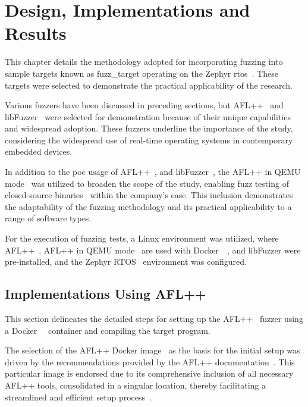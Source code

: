 \vspace{21.5pt}
\chapter{Design, Implementations and Results}

This chapter details the methodology adopted for incorporating fuzzing into
sample targets known as \gls{fuzz_target} operating on the
Zephyr \gls{rtos}~\cite{Security75:online}. These targets were selected to demonstrate the
practical applicability of the research.

Various fuzzers have been discussed in preceding sections, but
AFL++~\cite{257204} and libFuzzer~\cite{libFuzze17:online} were selected for
demonstration because of their unique capabilities and widespread adoption.
These fuzzers underline the importance of the study, considering the widespread
use of real-time operating systems in contemporary embedded devices.

In addition to the \acrlong{poc} usage of AFL++~\cite{257204}, and libFuzzer~\cite{libFuzze17:online}, the
AFL++ in QEMU mode~\cite{AFLplusp57:online} was utilized to broaden the scope of
the study, enabling fuzz testing of closed-source binaries~\cite{nagy2021breaking} within the company's case.
This inclusion demonstrates the adaptability of the fuzzing methodology and its
practical applicability to a range of software types.

For the execution of fuzzing tests, a Linux environment was utilized, where
AFL++~\cite{257204}, AFL++ in QEMU mode~\cite{AFLplusp57:online} are used with Docker~\cite{anderson2015docker}~\cite{aflplusp99:online},
and libFuzzer\cite{libFuzze17:online} were pre-installed, and the Zephyr RTOS~\cite{Security75:online}
environment was configured.


\section{Implementations Using AFL++}
This section delineates the detailed steps for setting up the
AFL++~\cite{257204} fuzzer using a Docker~\cite{anderson2015docker}~\cite{aflplusp99:online}
container and compiling the target program.

The selection of the AFL++ Docker image~\cite{aflplusp99:online} as the basis for the initial setup was
driven by the recommendations provided by the AFL++ documentation~\cite{GitHubAF78:online}. This particular
image is endorsed due to its comprehensive inclusion of all necessary AFL++ tools,
consolidated in a singular location, thereby facilitating a streamlined
and efficient setup process~\cite{257204}.

